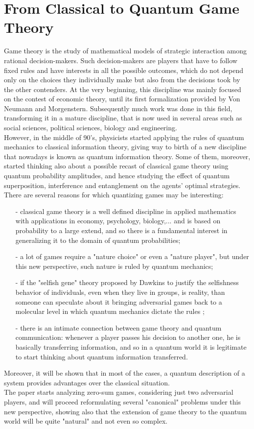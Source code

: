 \hfill

\section{From Classical to Quantum Game Theory}
Game theory is the study of mathematical models of strategic interaction among rational decision-makers. Such decision-makers are players that have to follow fixed rules and have interests in all the possible outcomes, which do not depend only on the choices they individually make but also from the decisions took by the other contenders. At the very beginning, this discipline was mainly focused on the contest of economic theory, until its first formalization provided by Von Neumann and Morgenstern. Subsequently much work was done in this field, transforming it in a mature discipline, that is now used in several areas such as social sciences, political sciences, biology and engineering.\\
However, in the middle of 90's, physicists started applying the rules of quantum mechanics to classical information theory, giving way to birth of a new discipline that nowadays is known as quantum information theory. Some of them, moreover, started thinking also about a possible recast of classical game theory using quantum probability amplitudes, and hence studying the effect of quantum superposition, interference and entanglement on the agents’ optimal strategies.\\
There are several reasons for which quantizing games may be interesting:
\begin{itemize}[noitemsep]
	\item[-] classical game theory is a well defined discipline in applied mathematics with applications in economy, psychology, biology,... and is based on probability to a large extend, and so there is a fundamental interest in generalizing it to the domain of quantum probabilities;
	\item[-] a lot of games require a "nature choice" or even a "nature player", but under this new perspective, such nature is ruled by quantum mechanics;
	\item[-] if the "selfish gene" theory proposed by Dawkins to justify the selfishness behavior of individuals, even when they live in groups, is reality, than someone can speculate about it bringing adversarial games back to a molecular level in which quantum mechanics dictate the rules \cite{ozhigov2013quantum};
	\item[-] there is an intimate connection between game theory and quantum communication: whenever a player passes his decision to another one, he is basically transferring information, and so in a quantum world it is legitimate to start thinking about quantum information transferred. 
\end{itemize} 
Moreover, it will be shown that in most of the cases, a quantum description of a system provides
advantages over the classical situation.\\
The paper starts analyzing zero-sum games, considering just two adversarial players, and will proceed reformulating several "canonical" problems under this new perspective, showing also that the extension of game theory to the quantum world will be quite "natural" and not even so complex. 
